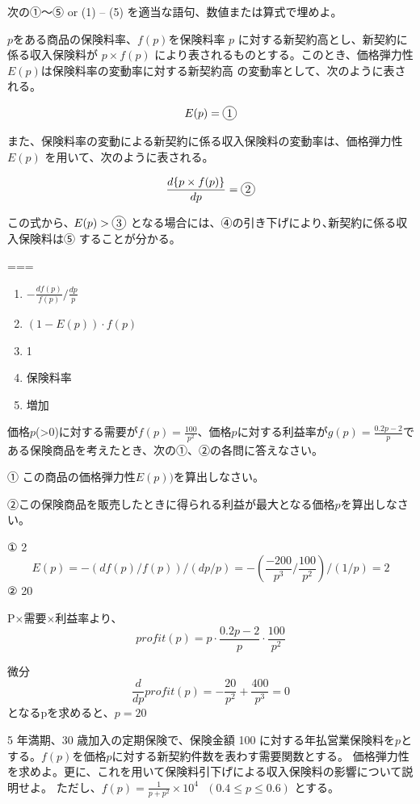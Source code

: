 \documentclass[report,gutter=10mm,fore-edge=10mm,uplatex,dvipdfmx]{jlreq}
\begin{document}

次の①～⑤ or (1) -- (5) を適当な語句、数値または算式で埋めよ。

\(p\)をある商品の保険料率、\(f(p)\)を保険料率 \(p\)
に対する新契約高とし、新契約に係る収入保険料が \(p \times f(p)\)
により表されるものとする。このとき、価格弾力性\(E(p)\)は保険料率の変動率に対する新契約高
の変動率として、次のように表される。

\[E(p) =  \cir{1} \]

また、保険料率の変動による新契約に係る収入保険料の変動率は、価格弾力性
\(E(p)\) を用いて、次のように表される。

\[\frac{d\{p \times f(p)\} }{dp}= \cir{2}\]

この式から､ \(E(p) > \cir{3}\) となる場合には、④の引き下げにより､新契約に係る収入保険料は⑤ することが分かる。

===


\begin{enumerate}
\tightlist
\item
  \(-\frac{df(p)}{f(p)} / \frac{dp}{p}\)
\item
  \((1-E(p))\cdot f(p)\)
\item
  1
\item
  保険料率
\item
  増加
\end{enumerate}


価格$p$(\textgreater{}0)に対する需要が\(f(p)=\frac{100}{p^2}\)、価格$p$に対する利益率が\(g(p)=\frac{0.2p-2}{p}\)である保険商品を考えたとき、次の①、②の各問に答えなさい。

① この商品の価格弾力性$E(p))$を算出しなさい。 

②この保険商品を販売したときに得られる利益が最大となる価格$p$を算出しなさい。

① 2
\[ E(p) = -(df(p)/f(p)) / (dp/p) = -(\frac{-200}{p^3}/\frac{100}{p^2})/(1/p) = 2\]
② 20 

P×需要×利益率より、
\[profit(p)=p\cdot\frac{0.2p-2}{p}\cdot\frac{100}{p^2}\]

微分 \[\frac{d}{dp} profit(p) = -\frac{20}{p^2}+\frac{400}{p^3}=0\]
となるpを求めると、\(p=20\)



5 年満期、30 歳加入の定期保険で、保険金額 100
に対する年払営業保険料を$p$とする。$f(p)$を価格$p$に対する新契約件数を表わす需要関数とする。
価格弾力性を求めよ。更に、これを用いて保険料引下げによる収入保険料の影響について説明せよ。
ただし、\(f(p)=\frac{1}{p+p^2}\times 10^4\ \ \  (0.4\leq p \leq 0.6)\)
とする。
\end{document}
